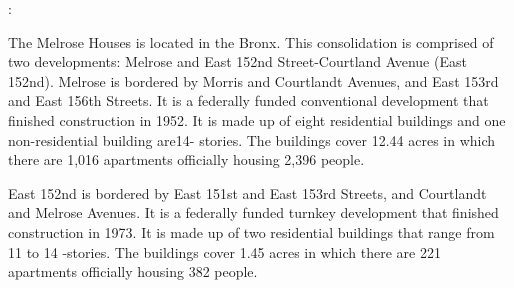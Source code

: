 : 

The Melrose Houses is located in the Bronx. This consolidation is comprised of two developments: Melrose and East 152nd Street-Courtland Avenue (East 152nd). Melrose is bordered by Morris and Courtlandt Avenues, and East 153rd and East 156th Streets. It is a federally funded conventional development that finished construction in 1952. It is made up of eight residential buildings and one non-residential building are14- stories. The buildings cover 12.44 acres in which there are 1,016 apartments officially housing 2,396 people. 

East 152nd is bordered by East 151st and East 153rd Streets, and Courtlandt and Melrose Avenues. It is a federally funded turnkey development that finished construction in 1973. It is made up of two residential buildings that range from 11 to 14 -stories. The buildings cover 1.45 acres in which there are 221 apartments officially housing 382 people. 